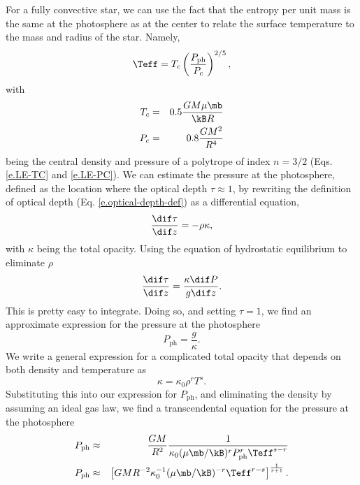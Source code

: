 For a fully convective star, we can use the fact that the entropy per unit mass is the same at the photosphere as at the center to relate the surface temperature to the mass and radius of the star. Namely,
\begin{equation}\label{e.Teff-adiabat}
\Teff = T_{c}\left(\frac{P_{\mathrm{ph}}}{P_{c}}\right)^{2/5},
\end{equation}
with
\begin{eqnarray}
T_{c} &=& 0.5 \frac{GM\mu \mb}{\kB R} \label{e.fc-Tc}\\
P_{c} &=& 0.8\frac{GM^{2}}{R^{4}} \label{e.fc-Pc}
\end{eqnarray}
being the central density and pressure of a polytrope of index $n=3/2$ (Eqs. \ref{e.LE-TC} and \ref{e.LE-PC}).
We can estimate the pressure at the photosphere, defined as the location where the optical depth $\tau \approx 1$, by rewriting the definition of optical depth (Eq. \ref{e.optical-depth-def}) as a differential equation,
\begin{equation}
  \frac{\dif \tau}{\dif z} = -\rho \kappa,
\end{equation}
with $\kappa$ being the total opacity.
Using the equation of hydrostatic equilibrium to eliminate $\rho$
\begin{equation}
  \frac{\dif \tau}{\dif z} = \frac{\kappa \dif P}{g \dif z}.
\end{equation}
This is pretty easy to integrate.
Doing so, and setting $\tau=1$, we find an approximate expression for the pressure at the photosphere
\begin{equation}
  P_\mathrm{ph} = \frac{g}{\kappa}.
\end{equation}
We write a general expression for a complicated total opacity that depends on both density and temperature as
\begin{equation}
  \kappa = \kappa_0 \rho^{r} T^{s}.
\end{equation}
Substituting this into our expression for $P_\mathrm{ph}$, and eliminating the density by assuming an ideal gas law, we find a transcendental equation for the pressure at the photosphere
\begin{eqnarray}\label{e.pph}
  P_{\mathrm{ph}} &\approx& \frac{GM}{R^{2}}\frac{1}{\kappa_{0}(\mu\mb/\kB)^{r}P_{\mathrm{ph}}^{r}\Teff^{s-r}}\nonumber\\
  P_{\mathrm{ph}} &\approx& \left[GM R^{-2} \kappa_{0}^{-1} (\mu\mb/\kB)^{-r}\Teff^{r-s} \right]^{\frac{1}{r+1}}.
\end{eqnarray}


